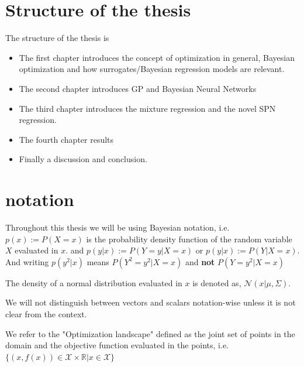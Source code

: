 \section{Structure of the thesis}
The structure of the thesis is
\begin{itemize}
    \item The first chapter introduces the concept of optimization in general, Bayesian optimization 
    and how surrogates/Bayesian regression models are relevant.
    \item The second chapter introduces GP and Bayesian Neural Networks
    \item The third chapter introduces the mixture regression and the novel SPN regression.
    \item The fourth chapter results
    \item Finally a discussion and conclusion.
\end{itemize}


\section{notation}
Throughout this thesis we will be using Bayesian notation, i.e. $p(x) := P(X=x)$ is the probability
density function of the random variable $X$ evaluated in $x$. and $p(y|x) := P(Y=y|X=x)$ or $p(y|x)
:= P(Y|X=x)$. And writing $p(y^2|x)$ means $P(Y^2=y^2|X=x)$ and \textbf{not} $P(Y=y^2|X=x)$

The density of a normal distribution evaluated in $x$ is denoted as, $\mathcal{N}(x|\mu, \Sigma)$. 

We will not distinguish between vectors and scalars notation-wise unless it is not clear from the 
context. 

We refer to the "Optimization landscape" defined as the joint set of points in the domain and the objective function
evaluated in the points, i.e. $\{(x,f(x))\in \mathcal{X} \times \mathbb{R}| x \in \mathcal{X}\}$
